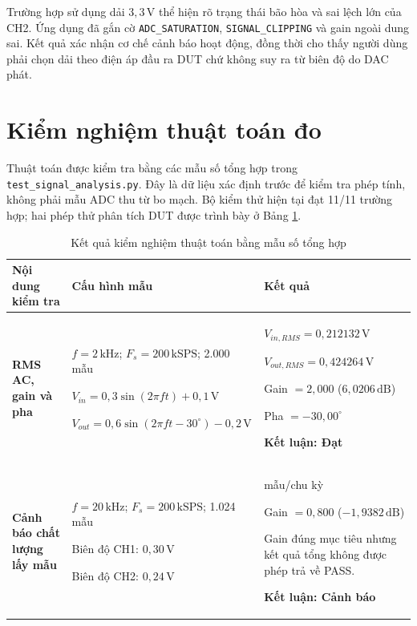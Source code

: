 \documentclass[12pt,a4paper]{report}
\newcommand{\code}[1]{\texttt{#1}}
\newcommand{\unit}[1]{\,\mathrm{#1}}
\newcommand{\tableheadcolor}{\rowcolor{gray!18}}
\renewcommand{\arraystretch}{1.2}
\begin{document}
Trường hợp sử dụng dải $3{,}3\unit{V}$ thể hiện rõ trạng thái bão hòa và sai lệch lớn của CH2. Ứng dụng đã gắn cờ \code{ADC\_SATURATION}, \code{SIGNAL\_CLIPPING} và gain ngoài dung sai. Kết quả xác nhận cơ chế cảnh báo hoạt động, đồng thời cho thấy người dùng phải chọn dải theo điện áp đầu ra DUT chứ không suy ra từ biên độ do DAC phát.

\section{Kiểm nghiệm thuật toán đo}
Thuật toán được kiểm tra bằng các mẫu số tổng hợp trong
\code{test\_signal\_analysis.py}. Đây là dữ liệu xác định trước để kiểm tra phép
tính, không phải mẫu ADC thu từ bo mạch. Bộ kiểm thử hiện tại đạt 11/11 trường
hợp; hai phép thử phân tích DUT được trình bày ở Bảng
\ref{tab:measurementresult}.

\begin{table}[H]
\centering
\caption{Kết quả kiểm nghiệm thuật toán bằng mẫu số tổng hợp}
\label{tab:measurementresult}
\small
\renewcommand{\arraystretch}{1.25}
\begin{tabularx}{\textwidth}{|
    >{\raggedright\arraybackslash}p{3.0cm}|
    >{\raggedright\arraybackslash}p{5.2cm}|
    >{\raggedright\arraybackslash}X|}
\hline
\tableheadcolor
\textbf{Nội dung kiểm tra} & \textbf{Cấu hình mẫu} &
\textbf{Kết quả} \\ \hline

\textbf{RMS AC, gain và pha}
& $f=2\unit{kHz}$; $F_s=200\unit{kSPS}$; 2.000 mẫu

$V_{in}=0{,}3\sin(2\pi ft)+0{,}1\unit{V}$

$V_{out}=0{,}6\sin(2\pi ft-30^\circ)-0{,}2\unit{V}$
& $V_{in,RMS}=0{,}212132\unit{V}$

$V_{out,RMS}=0{,}424264\unit{V}$

Gain $=2{,}000$ ($6{,}0206\unit{dB}$)

Pha $=-30{,}00^\circ$

\textbf{Kết luận: Đạt} \\ \hline

\textbf{Cảnh báo chất lượng lấy mẫu}
& $f=20\unit{kHz}$; $F_s=200\unit{kSPS}$; 1.024 mẫu

Biên độ CH1: $0{,}30\unit{V}$

Biên độ CH2: $0{,}24\unit{V}$
& 10 mẫu/chu kỳ

Gain $=0{,}800$ ($-1{,}9382\unit{dB}$)

Gain đúng mục tiêu nhưng kết quả tổng không được phép trả về PASS.

\textbf{Kết luận: Cảnh báo} \\ \hline
\end{tabularx}
\end{table}
\end{document}
